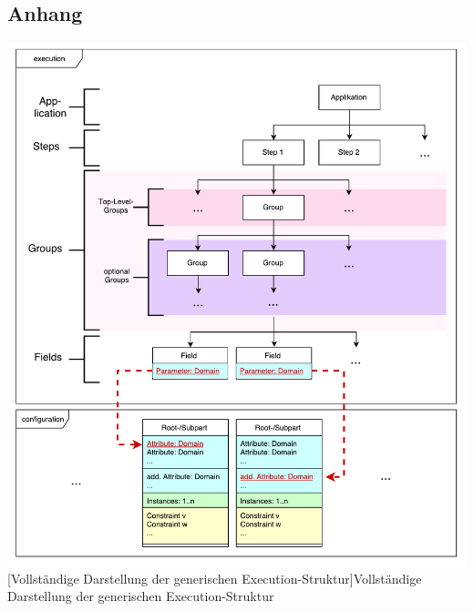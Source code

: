 
\renewcommand\refname{Anhang}
\begin{appendix}
\renewcommand\thefigure{A.\arabic{figure}}
\chapter*{Anhang}

\vspace{1em}
\begin{minipage}{\linewidth}
	\centering
	\includegraphics[width=1\linewidth]{Abbildungen/tactonModellExecution.pdf}
	[Vollständige Darstellung der generischen Execution-Struktur]{Vollständige Darstellung der generischen Execution-Struktur}
	\label{app:tactonModellExecutionLong}
\end{minipage}
\vspace{1em}


\end{appendix}
